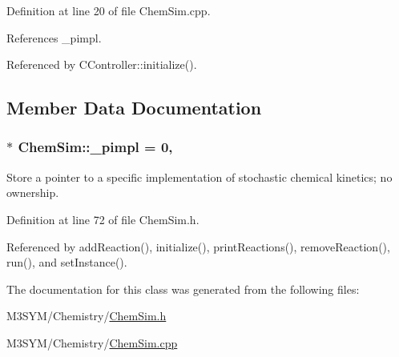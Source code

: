 Definition at line 20 of file Chem\+Sim.\+cpp.



References \+\_\+pimpl.



Referenced by C\+Controller\+::initialize().



\subsection{Member Data Documentation}
\hypertarget{classChemSim_a925fca4c4b0e800007163500b8b7909d}{
\subsubsection[{\+\_\+pimpl}]{ $\ast$ Chem\+Sim\+::\+\_\+pimpl = 0\hspace{0.3cm}{\ttfamily [static]}, {\ttfamily [private]}}}\label{classChemSim_a925fca4c4b0e800007163500b8b7909d}


Store a pointer to a specific implementation of stochastic chemical kinetics; no ownership. 



Definition at line 72 of file Chem\+Sim.\+h.



Referenced by add\+Reaction(), initialize(), print\+Reactions(), remove\+Reaction(), run(), and set\+Instance().



The documentation for this class was generated from the following files\+:\begin{DoxyCompactItemize}
\item 
M3\+S\+Y\+M/\+Chemistry/\hyperlink{ChemSim_8h}{Chem\+Sim.\+h}\item 
M3\+S\+Y\+M/\+Chemistry/\hyperlink{ChemSim_8cpp}{Chem\+Sim.\+cpp}\end{DoxyCompactItemize}
